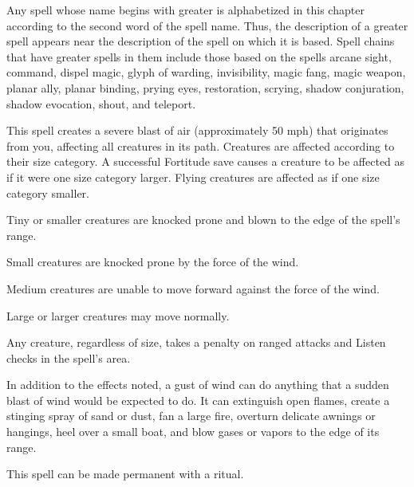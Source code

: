 \par Any spell whose name begins with greater is alphabetized in this chapter according to the second word of the spell name. Thus, the description of a greater spell appears near the description of the spell on which it is based. Spell chains that have greater spells in them include those based on the spells arcane sight, command, dispel magic, glyph of warding, invisibility, magic fang, magic weapon, planar ally, planar binding, prying eyes, restoration, scrying, shadow conjuration, shadow evocation, shout, and teleport.

\begin{spelleffect}
  This spell creates a severe blast of air (approximately 50 mph) that originates from you, affecting all creatures in its path. Creatures are affected according to their size category. A successful Fortitude save causes a creature to be affected as if it were one size category larger. Flying creatures are affected as if one size category smaller.
  \begin{itemize*}
    \item Tiny or smaller creatures are knocked prone and blown to the edge of the spell's range.
    \item Small creatures are knocked prone by the force of the wind.
    \item Medium creatures are unable to move forward against the force of the wind.
    \item Large or larger creatures may move normally.
  \end{itemize*}
  \par Any creature, regardless of size, takes a  penalty on ranged attacks and Listen checks in the spell's area.
  \par In addition to the effects noted, a gust of wind can do anything that a sudden blast of wind would be expected to do. It can extinguish open flames, create a stinging spray of sand or dust, fan a large fire, overturn delicate awnings or hangings, heel over a small boat, and blow gases or vapors to the edge of its range.
\end{spelleffect}
\begin{spellnotes}
This spell can be made permanent with a  ritual.
\end{spellnotes}

